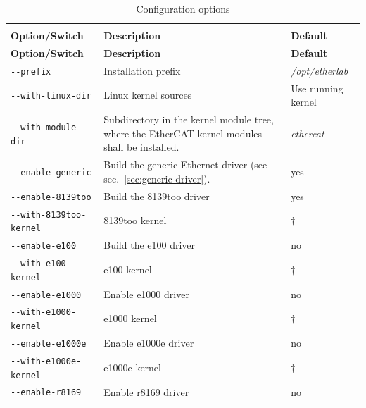 \documentclass[a4paper,12pt,BCOR6mm,bibtotoc,idxtotoc]{scrbook}
\begin{document}
\begin{longtable}{l|p{}|l}
  \caption{Configuration options}\rule[-5ex]{0mm}{0mm}
  \label{tab:config}\\

\textbf{Option/Switch} & \textbf{Description} & \textbf{Default}\\\hline
\endfirsthead

\textbf{Option/Switch} & \textbf{Description} & \textbf{Default}\\\hline
\endhead

\lstinline+--prefix+ & Installation prefix & \textit{/opt/etherlab}\\

\lstinline+--with-linux-dir+ & Linux kernel sources & Use running kernel\\

\lstinline+--with-module-dir+ & Subdirectory in the kernel module tree, where
the EtherCAT kernel modules shall be installed. & \textit{ethercat}\\

\hline

\lstinline+--enable-generic+ & Build the generic Ethernet driver (see
sec.~\ref{sec:generic-driver}). & yes\\

\lstinline+--enable-8139too+ & Build the 8139too driver & yes\\

\lstinline+--with-8139too-kernel+ & 8139too kernel & $\dagger$\\

\lstinline+--enable-e100+ & Build the e100 driver & no\\

\lstinline+--with-e100-kernel+ & e100 kernel & $\dagger$\\

\lstinline+--enable-e1000+ & Enable e1000 driver & no\\

\lstinline+--with-e1000-kernel+ & e1000 kernel & $\dagger$\\

\lstinline+--enable-e1000e+ & Enable e1000e driver & no\\

\lstinline+--with-e1000e-kernel+ & e1000e kernel & $\dagger$\\

\lstinline+--enable-r8169+ & Enable r8169 driver & no\\


\end{longtable}
\end{document}
